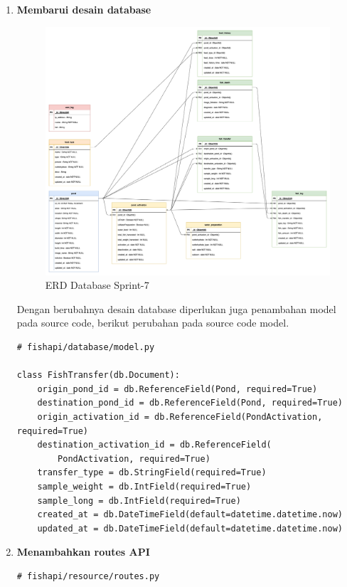 \begin{enumerate}[1.]

\item \textbf{Membarui desain database}

\begin{figure}[H]
	\centering
	\includegraphics[height=0.7\textwidth]{gambar/Sprint07/diagram database/database}
	\caption{ERD Database Sprint-7}
	\label{fig:database_sprint7}
\end{figure}

Dengan berubahnya desain database diperlukan juga penambahan model pada source code, berikut perubahan pada source code model.

\begin{lstlisting}
# fishapi/database/model.py

class FishTransfer(db.Document):
    origin_pond_id = db.ReferenceField(Pond, required=True)
    destination_pond_id = db.ReferenceField(Pond, required=True)
    origin_activation_id = db.ReferenceField(PondActivation, required=True)
    destination_activation_id = db.ReferenceField(
        PondActivation, required=True)
    transfer_type = db.StringField(required=True)
    sample_weight = db.IntField(required=True)
    sample_long = db.IntField(required=True)
    created_at = db.DateTimeField(default=datetime.datetime.now)
    updated_at = db.DateTimeField(default=datetime.datetime.now)
\end{lstlisting}



\item \textbf{Menambahkan routes API}

\begin{lstlisting}
# fishapi/resource/routes.py


\end{lstlisting}
\end{enumerate}
